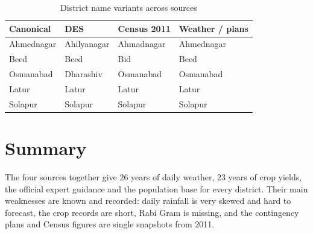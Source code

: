 \begin{table}[H]
	\centering
	\caption{District name variants across sources}
	\label{tab:names}
	\begin{tabular}{llll}
		\toprule
		\textbf{Canonical} & \textbf{DES} & \textbf{Census 2011} & \textbf{Weather / plans} \\
		\midrule
		Ahmednagar & Ahilyanagar & Ahmadnagar & Ahmednagar \\
		Beed & Beed & Bid & Beed \\
		Osmanabad & Dharashiv & Osmanabad & Osmanabad \\
		Latur & Latur & Latur & Latur \\
		Solapur & Solapur & Solapur & Solapur \\
		\bottomrule
	\end{tabular}
\end{table}

\section{Summary}
The four sources together give 26 years of daily weather, 23 years of crop yields, the official expert guidance and the population base for every district. Their main weaknesses are known and recorded: daily rainfall is very skewed and hard to forecast, the crop records are short, Rabi Gram is missing, and the contingency plans and Census figures are single snapshots from 2011.
